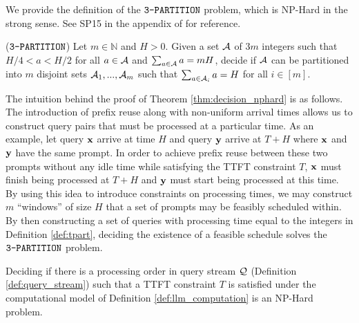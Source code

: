 We provide the definition of the $\texttt{3-PARTITION}$ problem, which is NP-Hard in the strong sense. See SP15 in the appendix of \cite{garey1979computers} for reference.
\begin{definition}\label{def:tpart}
    ($\texttt{3-PARTITION}$) Let $m \in \mathbb{N}$ and $H > 0$. Given a set $\mathcal{A}$ of $3m$ integers such that $H/4 < a < H/2$ for all $a \in \mathcal{A}$ and $\sum_{a \in \mathcal{A}} a = mH$, decide if $\mathcal{A}$ can be partitioned into $m$ disjoint sets $\mathcal{A}_1,...,\mathcal{A}_m$ such that $\sum_{a \in \mathcal{A}_i} a = H$ for all $i \in [m]$.
\end{definition}

The intuition behind the proof of Theorem \ref{thm:decision_nphard} is as follows. The introduction of prefix reuse along with non-uniform arrival times allows us to construct query pairs that must be processed at a particular time. As an example, let query $\mathbf{x}$ arrive at time $H$ and query $\mathbf{y}$ arrive at $T + H$ where $\mathbf{x}$ and $\mathbf{y}$ have the same prompt. In order to achieve prefix reuse between these two prompts without any idle time while satisfying the TTFT constraint $T$, $\mathbf{x}$ must finish being processed at $T + H$ and $\mathbf{y}$ must start being processed at this time. By using this idea to introduce constraints on processing times, we may construct $m$ ``windows'' of size $H$ that a set of prompts may be feasibly scheduled within. By then constructing a set of queries with processing time equal to the integers in Definition \ref{def:tpart}, deciding the existence of a feasible schedule solves the $\texttt{3-PARTITION}$ problem.

\begin{theorem}\label{thm:decision_nphard}
    Deciding if there is a processing order in query stream $\mathcal{Q}$ (Definition \ref{def:query_stream}) such that a TTFT constraint $T$ is satisfied under the computational model of Definition \ref{def:llm_computation} is an NP-Hard problem.
\end{theorem}

